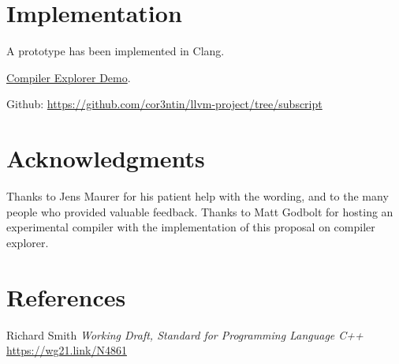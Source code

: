 \documentclass{wg21}
\begin{document}
\section{Implementation}

A prototype has been implemented in Clang.

\href{https://gcc.godbolt.org/z/4szfLo}{Compiler Explorer Demo}.

Github: \url{https://github.com/cor3ntin/llvm-project/tree/subscript}

\section{Acknowledgments}

Thanks to Jens Maurer for his patient help with the wording, and to the many people who provided valuable feedback.
Thanks to Matt Godbolt for hosting an experimental compiler with the implementation
of this proposal on compiler explorer.

\section{References}
\renewcommand{\section}[2]{}%



\begin{thebibliography}{9}

    Richard Smith
    \emph{Working Draft, Standard for Programming Language C++}\newline
    \url{https://wg21.link/N4861}

\end{thebibliography}
\end{document}
